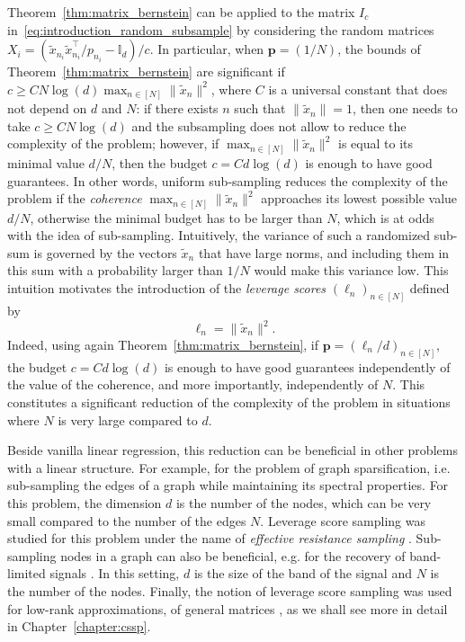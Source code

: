 \documentclass[twoside,11pt]{book}
\numberwithin{theorem}{chapter}
\numberwithin{definition}{chapter}
\numberwithin{proposition}{chapter}
\numberwithin{corollary}{chapter}
\numberwithin{example}{chapter}
\numberwithin{lemma}{chapter}
\numberwithin{assumption}{chapter}
\numberwithin{equation}{chapter}
\numberwithin{figure}{chapter}
\DeclareMathOperator{\Tran}{\intercal}
\begin{document}
Theorem~\ref{thm:matrix_bernstein} can be applied to the matrix $I_{c}$ in~\eqref{eq:introduction_random_subsample} by considering the random matrices $X_{i} = (\tilde{x}_{n_{i}}\tilde{x}_{n_{i}}^{\Tran}/p_{n_{i}} - \mathbb{I}_{d})/c$. In particular, when $\bm{p} =(1/N)$, the bounds of Theorem~\ref{thm:matrix_bernstein} are significant if $c \geq C N \log(d)\max_{n \in [N]}\|\tilde{x}_n\|^{2}$, where $C$ is a universal constant that does not depend on $d$ and $N$: if there exists $n$ such that $\|\tilde{x}_{n}\|=1$, then one needs to take $c \geq C N \log(d)$ and the subsampling does not allow to reduce the complexity of the problem; however, if $\max_{n \in [N]}\|\tilde{x}_n\|^{2}$ is equal to its minimal value $d/N$, then the budget $c = C d \log(d)$ is enough to have good guarantees. In other words, uniform sub-sampling reduces the complexity of the problem if the \emph{coherence} $\max_{n \in [N]}\|\tilde{x}_n\|^{2}$ approaches its lowest possible value $d/N$, otherwise the minimal budget has to be larger than $N$, which is at odds with the idea of sub-sampling. Intuitively, the variance of such a randomized sub-sum is governed by the vectors $\tilde{x}_{n}$ that have large norms, and including them in this sum with a probability larger than $1/N$  would make this variance low. This intuition motivates the introduction of the \emph{leverage scores} $(\ell_{n})_{n \in [N]}$ defined by
\begin{equation}
\ell_{n} = \|\tilde{x}_{n}\|^{2}.
\end{equation}
Indeed, using again Theorem~\ref{thm:matrix_bernstein}, if $\bm{p} = (\ell_{n}/d)_{n \in [N]}$, the budget $c = C d \log(d)$ is enough to have good guarantees independently of the value of the coherence, and more importantly, independently of $N$. This constitutes a significant reduction of the complexity of the problem in situations where $N$ is very large compared to $d$. 

Beside vanilla linear regression, this reduction can be beneficial in other problems with a linear structure. For example, for the problem of graph sparsification, i.e. sub-sampling the edges of a graph while maintaining its spectral properties. For this problem, the dimension $d$ is the number of the nodes, which can be very small compared to the number of the edges $N$. Leverage score sampling was studied for this problem under the name of \emph{effective resistance sampling} \citep*{SpTe04,SpSr11}. Sub-sampling nodes in a graph can also be beneficial, e.g. for the recovery of band-limited signals \citep*{PuTrGrVa18}. In this setting, $d$ is the  size of the band of the signal and $N$ is the number of the nodes. Finally, the notion of leverage score sampling was used for low-rank approximations, of general matrices \citep*{DrMaMu07}, as we shall see more in detail in Chapter~\ref{chapter:cssp}.
\end{document}
